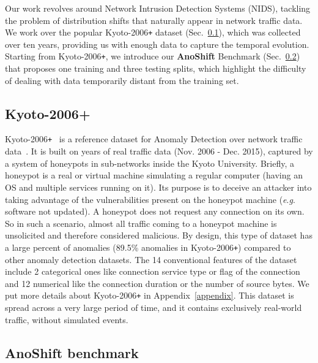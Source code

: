 \documentclass{article}
\newcommand{\eg}{\textit{e}.\textit{g}. }
\begin{document}
Our work revolves around Network Intrusion Detection Systems (NIDS), tackling the problem of distribution shifts that naturally appear in network traffic data. We work over the popular Kyoto-2006\texttt{+} dataset (Sec.~\ref{sec:kyoto}), which was collected over ten years, providing us with enough data to capture the temporal evolution. Starting from Kyoto-2006\texttt{+}, we introduce our \textbf{AnoShift} Benchmark (Sec.~\ref{sec:anoshift}) that proposes one training and three testing splits, which highlight the difficulty of dealing with data temporarily distant from the training set. 

\subsection{Kyoto-2006+}\label{sec:kyoto}

Kyoto-2006\texttt{+}~\cite{kyoto2006} is a reference dataset for Anomaly Detection over network traffic data~\cite{ring2019survey}. It is built on  years of real traffic data (Nov. 2006 - Dec. 2015), captured by a system of  honeypots in  sub-networks inside the Kyoto University. Briefly, a honeypot is a real or virtual machine simulating a regular computer (having an OS and multiple services running on it). Its purpose is to deceive an attacker into taking advantage of the vulnerabilities present on the honeypot machine (\eg software not updated). A honeypot does not request any connection on its own. So in such a scenario, almost all traffic coming to a honeypot machine is unsolicited and therefore considered malicious. By design, this type of dataset has a large percent of anomalies (89.5\% anomalies in Kyoto-2006\texttt{+}) compared to other anomaly detection datasets. The 14 conventional features of the dataset include 2 categorical ones like connection service type or flag of the connection and 12 numerical like the connection duration or the number of source bytes. We put more details about Kyoto-2006\texttt{+} in Appendix~\ref{appendix}. This dataset is spread across a very large period of time, and it contains exclusively real-world traffic, without simulated events.

\subsection{AnoShift benchmark}\label{sec:anoshift}
    
\end{document}
